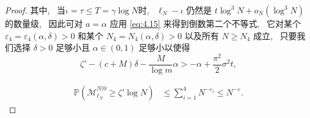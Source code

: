 \begin{proof}
{    }{
        其中,~ 当$\iota=\tau\le T=\gamma\log N$时,~ $\ell_N-\iota$ 仍然是 $t\log^3N+o_N(\log^3N)$ 的数量级,~ 因此可对 $a=\alpha$ 应用 \eqref{eq:4.15} 来得到倒数第二个不等式,~ 它对某个 $\varepsilon_4=\varepsilon_4(\alpha,\delta)>0$ 和某个 $N_4=N_4(\alpha,\delta)>0$ 以及所有 $N\ge N_4$ 成立,~ 只要我们选择 $\delta>0$ 足够小且 $\alpha\in(0,1)$ 足够小以使得
    }
    \begin{equation*}
        \zeta'-(c+M)\delta-\frac M{\log m}\alpha
        >
        -\alpha+\frac{\pi^2}2\sigma^2 t,
    \end{equation*}

    \begin{align*}
        \mathbb P\left(
            \mathcal M^{N|0}_{\ell_N}
            \ge
            \zeta'\log N
        \right)
        &
        \le
        \sum_{i=1}^4N^{-\varepsilon_i}
        \le
        N^{-\varepsilon}.
    \end{align*}
\end{proof}
